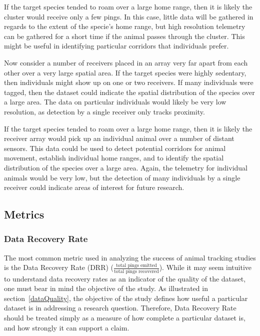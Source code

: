 If the target species tended to roam over a large home range, then it is likely the cluster would receive only a few pings.  In this case, little data will be gathered in regards to the extent of the specie's home range, but high resolution telemetry can be gathered for a short time if the animal passes through the cluster.  This might be useful in identifying particular corridors that individuals prefer.

Now consider a number of receivers placed in an array very far apart from each other over a very large spatial area.
If the target species were highly sedentary, then individuals might show up on one or two receivers.  If many individuals were tagged, then the dataset could indicate the spatial distribution of the species over a large area.  The data on particular individuals would likely be very low resolution, as detection by a single receiver only tracks proximity.  

If the target species tended to roam over a large home range, then it is likely the receiver array would pick up an individual animal over a number of distant sensors.  This data could be used to detect potential corridors for animal movement, establish individual home ranges, and to identify the spatial distribution of the species over a large area.  Again, the telemetry for individual animals would be very low, but the detection of many individuals by a single receiver could indicate areas of interest for future research.

\subsection{Metrics}
\subsubsection{Data Recovery Rate}
\label{DataRecoveryRate}
The most common metric used in analyzing the success of animal tracking studies is the Data Recovery Rate (DRR) ($\frac{\mbox{total pings emitted}}{\mbox{total pings recovered}}$).  While it may seem intuitive to understand data recovery rates as an indicator of the quality of the dataset, one must bear in mind the objective of the study.  As illustrated in section~\ref{dataQuality}, the objective of the study defines how useful a particular dataset is in addressing a research question.  Therefore, Data Recovery Rate should be treated simply as a measure of how complete a particular dataset is, and how strongly it can support a claim.  

